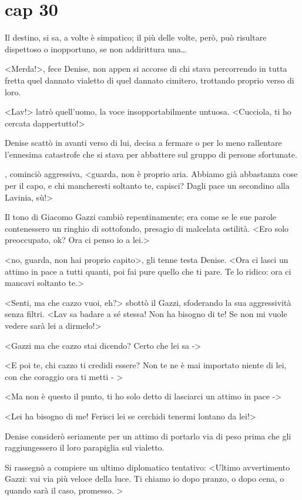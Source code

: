 \chapter{cap 30}

Il destino, si sa, a volte è simpatico; il più delle volte, però, può
risultare dispettoso o inopportuno, se non addirittura una\ldots{}

<Merda!>, fece Denise, non appen si accorse di
chi stava percorrendo in tutta fretta quel dannato vialetto di quel
dannato cimitero, trottando proprio verso di loro.

<Lav!> latrò quell'uomo, la voce
insopportabilmente untuosa. <Cucciola, ti ho cercata
dappertutto!>

Denise scattò in avanti verso di lui, decisa a fermare o per lo meno
rallentare l'ennesima catastrofe che si stava per abbattere sul gruppo
di persone sfortunate.

, cominciò aggressiva, <guarda, non è proprio aria. Abbiamo
già abbastanza cose per il capo, e chi mancheresti soltanto te, capisci?
Dagli pace un secondino alla Lavinia, sù!>

Il tono di Giacomo Gazzi cambiò repentinamente; era come se le sue
parole contenessero un ringhio di sottofondo, presagio di malcelata
ostilità. <Ero solo preoccupato, ok? Ora ci penso io a
lei.>

<no, guarda, non hai proprio capito>, gli tenne
testa Denise. <Ora ci lasci un attimo in pace a tutti quanti,
poi fai pure quello che ti pare. Te lo ridico: ora ci mancavi soltanto
te.>

<Senti, ma che cazzo vuoi, eh?> sbottò il Gazzi,
sfoderando la sua aggressività senza filtri. <Lav sa badare a
sé stessa! Non ha bisogno di te! Se non mi vuole vedere sarà lei a
dirmelo!>

<Gazzi ma che cazzo stai dicendo? Certo che lei sa
->

<E poi te, chi cazzo ti credidi essere? Non te ne è mai
importato niente di lei, con che coraggio ora ti metti - >

<Ma non è questo il punto, ti ho solo detto di lasciarci un
attimo in pace ->

<Lei ha bisogno di me! Ferisci lei se cerchidi tenermi lontano
da lei!>

Denise considerò seriamente per un attimo di portarlo via di peso prima
che gli raggiungessero il loro parapiglia sul vialetto.

Si rassegnò a compiere un ultimo diplomatico tentativo:
<Ultimo avvertimento Gazzi: vai via più veloce della luce. Ti
chiamo io dopo pranzo, o dopo cena, o quando sarà il caso, promesso.
>

